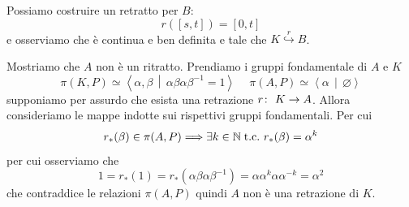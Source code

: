 \begin{example}
\begin{enumerate}
		Possiamo costruire un retratto per $B$: 
		\begin{equation*}
			r(\left[s,t\right]) = \left[0,t\right]
		\end{equation*}
		e osserviamo che è continua e ben definita e tale che $K \overset{r}{\hookrightarrow} B$.\
		
		Mostriamo che $A$ non è un ritratto. Prendiamo i gruppi fondamentale di $A$ e $K$ 
		\begin{equation*}
			\pi(K, P) \simeq \left\langle \alpha, \beta \,\middle|\, \alpha\beta\alpha\beta^{-1} = 1 \right\rangle \quad\ \pi(A, P) \simeq \left\langle \alpha \,\middle|\, \varnothing \right\rangle
		\end{equation*}
		supponiamo per assurdo che esista una retrazione $r \colon\ K \rightarrow A$. Allora consideriamo le mappe indotte sui rispettivi gruppi fondamentali. Per cui
		\begin{equation*}
			r_*(\beta) \in \pi(A, P) \Longrightarrow \exists k \in \mathbb{N} \; \text{t.c.}\ r_*(\beta) = \alpha^k
		\end{equation*}
		per cui osserviamo che 
		\begin{equation*}
			 1 = r_*(1) = r_*(\alpha\beta\alpha\beta^{-1}) = \alpha\alpha^k\alpha\alpha^{-k} = \alpha^2
		\end{equation*}
		che contraddice le relazioni $\pi(A, P)$ quindi $A$ non è una retrazione di $K$. 		
	\end{enumerate}
\end{example}
